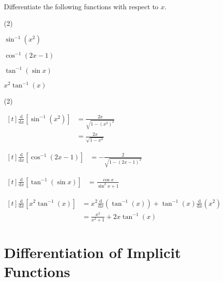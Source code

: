 \documentclass[11pt,a4paper]{book}
\begin{document}
\begin{example}

Differentiate the following functions with respect to $x$.

\begin{tasks}[label=(\alph*),label-width=3.5ex,after-item-skip=2mm](2)

\task  $\sin^{-1}\left(x^{2}\right)$

\task  $\cos^{-1}\left(2x-1\right)$

\task  $\tan^{-1}\left(\sin x\right)$

\task  $x^{2}\tan^{-1}\left(x\right)$

\end{tasks}

\Solution

\begin{tasks}[label=(\alph*),label-width=3.5ex,after-item-skip=1cm](2)

\task
$
\begin{aligned}[t]
\frac{\mathrm{d}}{\mathrm{d}x}{\displaystyle \left[\sin^{-1}\left(x^{2}\right)\right]} & =\frac{2x}{\sqrt{1-\left(x^{2}\right)^{2}}}\\
 & =\frac{2x}{\sqrt{1-x^{4}}}
\end{aligned}
$

\task
$
\begin{aligned}[t]
\frac{\mathrm{d}}{\mathrm{d}x}{\displaystyle \left[{\displaystyle \cos^{-1}}\left(2x-1\right)\right]} & =-\frac{2}{\sqrt{1-\left(2x-1\right)^{2}}}
\end{aligned}
$

\task
$
\begin{aligned}[t]
\frac{\mathrm{d}}{\mathrm{d}x}\left[\tan^{-1}\left(\sin x\right)\right] & =\frac{\cos x}{\sin^{2}x+1}
\end{aligned}
$

\task
$
\begin{aligned}[t]
\frac{\mathrm{d}}{\mathrm{d}x}{\displaystyle \left[x^{2}\tan^{-1}\left(x\right)\right]} & =x^{2}\frac{\mathrm{d}}{\mathrm{d}x}\left(\tan^{-1}\left(x\right)\right)+\tan^{-1}\left(x\right)\frac{\mathrm{d}}{\mathrm{d}x}\left(x^{2}\right)\\
 & =\frac{x^{2}}{x^{2}+1}+2x\tan^{-1}(x)
\end{aligned}
$

\end{tasks}

\end{example}

\section{Differentiation of Implicit Functions}
\end{document}
